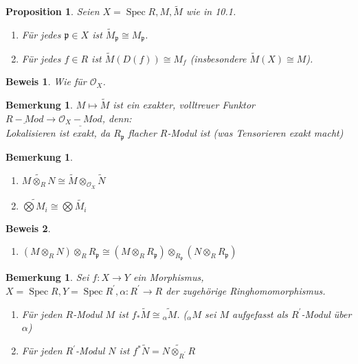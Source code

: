 \documentclass[a4paper,oneside]{scrbook}
\theoremstyle{break}
\newtheorem{Bem}[Def]{Bemerkung}
\newtheorem{Prop}[Def]{Proposition}
\theoremstyle{nonumberbreak}
\theoremstyle{nonumberplain}
\newtheorem{Bew}{Beweis}
\theoremstyle{break}
\newcommand{\Cat}[1]{%
	\ensuremath{\underline{#1}}%
}
\newcommand{\Spec}{%
	\ensuremath{\operatorname{Spec}}%
}
\begin{document}
\begin{Prop}
  \label{prop:10.2}
  Seien $X=\Spec R, M,\widetilde{M}$ wie in 10.1.
  \begin{enumerate}
  \item Für jedes $\mathfrak p\in X$ ist $\widetilde{M}_{\mathfrak p}\cong M_{\mathfrak p}$.
  \item Für jedes $f\in R$ ist $\widetilde{M}(D(f))\cong M_f$ (insbesondere $\widetilde{M}(X)\cong M$).
  \end{enumerate}
\end{Prop}

\begin{Bew}
  Wie für $\mathcal O_X$.
\end{Bew}

\begin{Bem}
  \label{bem:10.3}
  $M\mapsto \widetilde{M}$ ist ein exakter, volltreuer Funktor $\Cat{R-Mod}\to\Cat{\mathcal O_X-Mod}$, denn: \\
  Lokalisieren ist exakt, da $R_{\mathfrak p}$ flacher $R$-Modul ist (was Tensorieren exakt macht)
\end{Bem}

\begin{Bem}
  \label{bem:10.4}
  \begin{enumerate}
  \item $\widetilde{M\otimes_RN}\cong\widetilde{M}\otimes_{\mathcal O_X}\widetilde{N}$
  \item $\widetilde{\bigotimes M_i}\cong\bigotimes\widetilde{M_i}$
  \end{enumerate}
\end{Bem}

\begin{Bew}
  \begin{enumerate}
  \item $(M\otimes_RN)\otimes_RR_{\mathfrak p}\cong (M\otimes_RR_{\mathfrak p})\otimes_{R_{\mathfrak p}}(N\otimes_RR_{\mathfrak p})$
  \end{enumerate}
\end{Bew}

\begin{Bem}
  \label{bem:10.5}
  Sei $f:X\to Y$ ein Morphismus, $X=\Spec R, Y=\Spec R^\prime, \alpha: R^\prime\to R$ der zugehörige Ringhomomorphismus.
  \begin{enumerate}
  \item Für jeden $R$-Modul $M$ ist $f_\ast\widetilde{M}\cong \widetilde{_\alpha M}$. ($_\alpha M$ sei $M$ aufgefasst als $R^\prime$-Modul über $\alpha$)
  \item Für jeden $R^\prime$-Modul $N$ ist $f^\ast\widetilde{N}=\widetilde{N\otimes_{R^\prime}R}$
  \end{enumerate}
\end{Bem}
\end{document}
